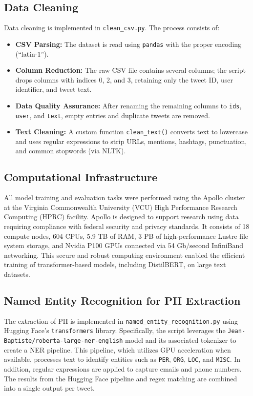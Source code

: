 \documentclass{article}
\begin{document}
\subsection{Data Cleaning}
Data cleaning is implemented in \texttt{clean\_csv.py}. The process consists of:
\begin{itemize}
    \item \textbf{CSV Parsing:} The dataset is read using \texttt{pandas} with the proper encoding (``latin-1'').
    \item \textbf{Column Reduction:} The raw CSV file contains several columns; the script drops columns with indices 0, 2, and 3, retaining only the tweet ID, user identifier, and tweet text.
    \item \textbf{Data Quality Assurance:} After renaming the remaining columns to \texttt{ids}, \texttt{user}, and \texttt{text}, empty entries and duplicate tweets are removed.
    \item \textbf{Text Cleaning:} A custom function \texttt{clean\_text()} converts text to lowercase and uses regular expressions to strip URLs, mentions, hashtags, punctuation, and common stopwords (via NLTK).
\end{itemize}

\subsection{Computational Infrastructure}
All model training and evaluation tasks were performed using the Apollo cluster at the Virginia Commonwealth University (VCU) High Performance Research Computing (HPRC) facility. Apollo is designed to support research using data requiring compliance with federal security and privacy standards. It consists of 18 compute nodes, 604 CPUs, 5.9 TB of RAM, 3 PB of high-performance Lustre file system storage, and Nvidia P100 GPUs connected via 54 Gb/second InfiniBand networking. This secure and robust computing environment enabled the efficient training of transformer-based models, including DistilBERT, on large text datasets.

\subsection{Named Entity Recognition for PII Extraction}
The extraction of PII is implemented in \texttt{named\_entity\_recognition.py} using Hugging Face's \texttt{transformers} library. Specifically, the script leverages the \texttt{Jean-Baptiste/roberta-large-ner-english} model and its associated tokenizer to create a NER pipeline. This pipeline, which utilizes GPU acceleration when available, processes text to identify entities such as \texttt{PER}, \texttt{ORG}, \texttt{LOC}, and \texttt{MISC}. In addition, regular expressions are applied to capture emails and phone numbers. The results from the Hugging Face pipeline and regex matching are combined into a single output per tweet.
\end{document}
